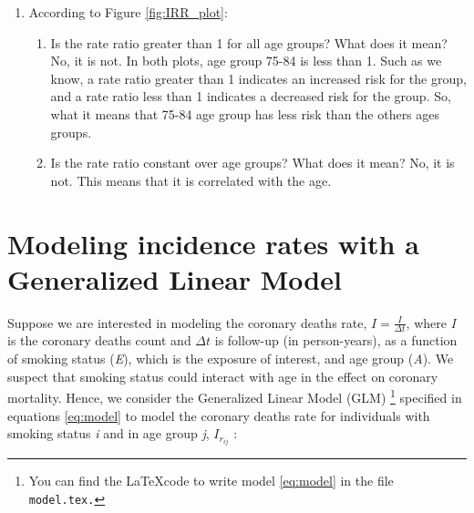 \documentclass[10pt,a4paper,twoside]{article}\usepackage[]{graphicx}\usepackage[]{xcolor}
\newenvironment{knitrout}{}{} %
\newcommand{\Robject}[1]{\texttt{#1}}
\begin{document}
\begin{enumerate}
\begin{knitrout}
\end{knitrout}
  \item According to Figure \ref{fig:IRR_plot}:
  \begin{enumerate}
    \item Is the rate ratio greater than 1 for all age groups? What does it mean?
    \newline 
    No, it is not. In both plots, age group 75-84 is less than 1. Such as we know, a rate ratio greater than 1 indicates an increased risk
    for the group, and a rate ratio less than 1 indicates a decreased risk for the group. So, what it means that 75-84 age group has less risk than
    the others ages groups.
    \item Is the rate ratio constant over age groups? What does it mean?
    \newline
    No, it is not. This means that it is correlated with the age.
  \end{enumerate}
\end{enumerate}


\section{Modeling incidence rates with a Generalized Linear Model}
\label{sec:Modelling}
Suppose we are interested in modeling the coronary deaths rate, $I = \frac{I}{\Delta t}$, where \textit{I} is the coronary deaths count and $\Delta t$ is follow-up (in person-years), as a function of smoking status (\textit{E}), which is the exposure of interest, and age group (\textit{A}). We suspect that smoking status could interact with age in the effect on coronary mortality. Hence, we consider the Generalized Linear Model (GLM) \footnote{You can find the \LaTeX code to write model \eqref{eq:model} in the file \Robject{model.tex.}} specified in equations \eqref{eq:model} to model the coronary deaths rate for individuals with smoking status \textit{i} and in age group \textit{j}, $I_{r_{ij}}$ :
\end{document}
